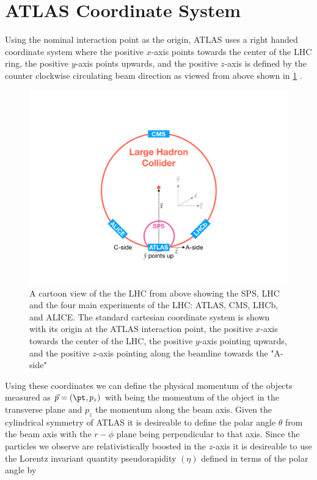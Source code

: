 \section{ATLAS Coordinate System} \label{sec:atlas:coordinates}

Using the nominal interaction point as the origin, ATLAS uses a right handed
coordinate system where the positive $x$-axis points towards the center of the
LHC ring, the positive $y$-axis points upwards, and the positive $z$-axis is
defined by the counter clockwise circulating beam direction as viewed from
above shown in \cref{fig:atlas_geometry} \cite{PERF-2007-01}.  
 
\begin{figure}[!htbp]
  \begin{center}
    \includegraphics[width=0.5\linewidth]{figures/atlas/atlas_geometry}
    \caption{ \cite{Stark:2317296} A cartoon view of the the LHC from above
showing the SPS, LHC and the four main experiments of the LHC: ATLAS, CMS, LHCb,
and ALICE.  The standard cartesian coordinate system is shown with its origin at
the ATLAS interaction point, the positive $x$-axis towards the center of the
LHC, the positive $y$-axis pointing upwards, and the positive $z$-axis pointing
along the beamline towards the "A-side"}
    \label{fig:atlas_geometry}
  \end{center}
\end{figure}

Using these coordinates we can define the physical momentum of the objects
measured as $\vec{p} = (\pt,p_z)$ with \pt being the momentum of the object in
the transverse plane and $p_z$ the momentum along the beam axis. Given the
cylindrical symmetry of ATLAS it is desireable to define the polar angle
$\theta$ from the beam axis with the $r-\phi$ plane being perpendicular to that
axis. Since the particles we observe are relativistically boosted in the
$z$-axis it is desireable to use the Lorentz invariant quantity pseudorapidity
$(\eta)$ defined in terms of the polar angle by

